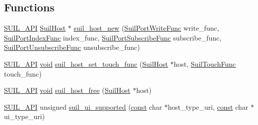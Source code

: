 \subsection*{Functions}
\begin{DoxyCompactItemize}
\item 
\hyperlink{suil_8h_a471ed687e8f67356d9926abaa1b9e2eb}{S\+U\+I\+L\+\_\+\+A\+PI} \hyperlink{group__suil_gac10e100afa94a434461386b79528c00c}{Suil\+Host} $\ast$ \hyperlink{group__suil_ga340293f89dd2317c673b85961f069c13}{suil\+\_\+host\+\_\+new} (\hyperlink{group__suil_ga2da768960d0b91c1515288387f4e5582}{Suil\+Port\+Write\+Func} write\+\_\+func, \hyperlink{group__suil_ga94e7dc09d4747a1d40f69ff4bef1e242}{Suil\+Port\+Index\+Func} index\+\_\+func, \hyperlink{group__suil_gab178a917cd59601d1c54121638dc8a3a}{Suil\+Port\+Subscribe\+Func} subscribe\+\_\+func, \hyperlink{group__suil_gaa38ef1f02fde6358c58b5c533b916797}{Suil\+Port\+Unsubscribe\+Func} unsubscribe\+\_\+func)
\item 
\hyperlink{suil_8h_a471ed687e8f67356d9926abaa1b9e2eb}{S\+U\+I\+L\+\_\+\+A\+PI} \hyperlink{sound_8c_ae35f5844602719cf66324f4de2a658b3}{void} \hyperlink{group__suil_ga6b8b669476988086e5a58243500ee8b5}{suil\+\_\+host\+\_\+set\+\_\+touch\+\_\+func} (\hyperlink{group__suil_gac10e100afa94a434461386b79528c00c}{Suil\+Host} $\ast$host, \hyperlink{group__suil_gaf64d2d3854b4fbe2de355407e5899aeb}{Suil\+Touch\+Func} touch\+\_\+func)
\item 
\hyperlink{suil_8h_a471ed687e8f67356d9926abaa1b9e2eb}{S\+U\+I\+L\+\_\+\+A\+PI} \hyperlink{sound_8c_ae35f5844602719cf66324f4de2a658b3}{void} \hyperlink{group__suil_ga8c26998668de1e134c1bcba72b3eede2}{suil\+\_\+host\+\_\+free} (\hyperlink{group__suil_gac10e100afa94a434461386b79528c00c}{Suil\+Host} $\ast$host)
\item 
\hyperlink{suil_8h_a471ed687e8f67356d9926abaa1b9e2eb}{S\+U\+I\+L\+\_\+\+A\+PI} unsigned \hyperlink{group__suil_gaf5add06fb50f1ba582552f6f15db403c}{suil\+\_\+ui\+\_\+supported} (\hyperlink{getopt1_8c_a2c212835823e3c54a8ab6d95c652660e}{const} char $\ast$host\+\_\+type\+\_\+uri, \hyperlink{getopt1_8c_a2c212835823e3c54a8ab6d95c652660e}{const} char $\ast$ui\+\_\+type\+\_\+uri)
\item 

\end{DoxyCompactItemize}
